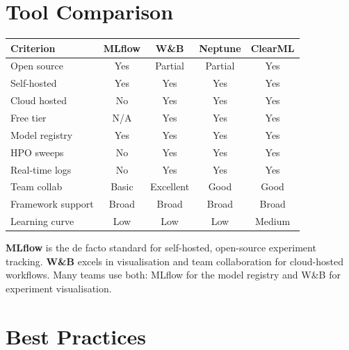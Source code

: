 \section{Tool Comparison}
\label{sec:tracking-comparison}

\begin{center}
\begin{tabular}{@{}lcccc@{}}
\toprule
\textbf{Criterion} & \textbf{MLflow} & \textbf{W\&B} & \textbf{Neptune} & \textbf{ClearML} \\
\midrule
Open source     & Yes   & Partial & Partial & Yes \\
Self-hosted     & Yes   & Yes     & Yes     & Yes \\
Cloud hosted    & No    & Yes     & Yes     & Yes \\
Free tier       & N/A   & Yes     & Yes     & Yes \\
Model registry  & Yes   & Yes     & Yes     & Yes \\
HPO sweeps      & No    & Yes     & Yes     & Yes \\
Real-time logs  & No    & Yes     & Yes     & Yes \\
Team collab     & Basic & Excellent & Good  & Good \\
Framework support & Broad & Broad  & Broad  & Broad \\
Learning curve  & Low   & Low     & Low     & Medium \\
\bottomrule
\end{tabular}
\end{center}

\begin{remark}
\textbf{MLflow} is the de facto standard for self-hosted, open-source
experiment tracking. \textbf{W\&B} excels in visualisation and team
collaboration for cloud-hosted workflows. Many teams use both: MLflow for
the model registry and W\&B for experiment visualisation.
\end{remark}

\section{Best Practices}

